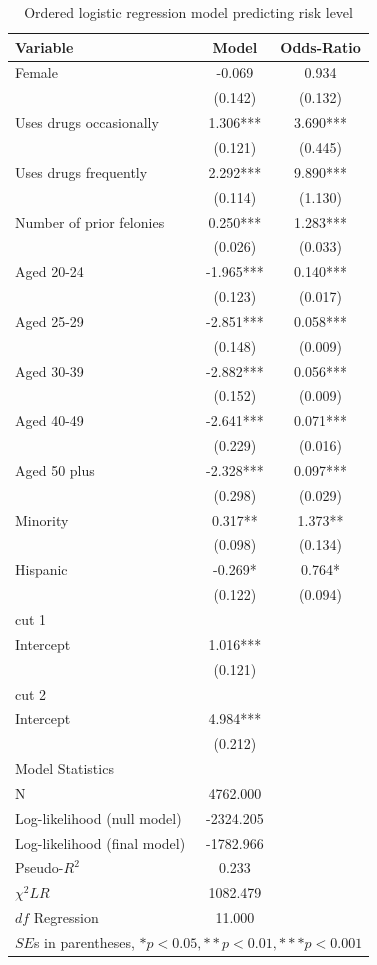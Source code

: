 \begin{table}[htbp]\centering
 \caption{Ordered logistic regression model predicting risk level \label{tab:recdologit}}
\begin{tabular}{lcc}
\hline
Variable      &    Model & Odds-Ratio  \\
\hline
Female   &   -0.069  &    0.934  \\
      &   (0.142)  &   (0.132)  \\
Uses drugs occasionally   &    1.306***&    3.690***\\
      &   (0.121)  &   (0.445)  \\
Uses drugs frequently   &    2.292***&    9.890***\\
      &   (0.114)  &   (1.130)  \\
Number of prior felonies    &    0.250***&    1.283***\\
      &   (0.026)  &   (0.033)  \\
Aged 20-24   &   -1.965***&    0.140***\\
      &   (0.123)  &   (0.017)  \\
Aged 25-29   &   -2.851***&    0.058***\\
      &   (0.148)  &   (0.009)  \\
Aged 30-39   &   -2.882***&    0.056***\\
      &   (0.152)  &   (0.009)  \\
Aged 40-49   &   -2.641***&    0.071***\\
      &   (0.229)  &   (0.016)  \\
Aged 50 plus   &   -2.328***&    0.097***\\
      &   (0.298)  &   (0.029)  \\
Minority    &    0.317** &    1.373** \\
      &   (0.098)  &   (0.134)  \\
Hispanic     &   -0.269* &    0.764* \\
      &   (0.122)  &   (0.094)  \\ \hline
cut 1    &        &        \\
Intercept    &    1.016***&    \\
      &   (0.121)  &   \\
cut 2    &        &        \\
Intercept    &    4.984***&   \\
      &   (0.212)  &   \\
\hline
\multicolumn{1}{l}{Model Statistics} \\
\hline
N      &   4762.000  \\
Log-likelihood (null model)    &  -2324.205  \\
Log-likelihood (final model)     &  -1782.966   \\
Pseudo-$R^2$    &    0.233  \\
$\chi^2 LR$    &   1082.479  \\
$df$ Regression    &    11.000  \\
\hline
\multicolumn{3}{l}{$SE$s in parentheses, $*p<0.05, **p<0.01, ***p<0.001$} \\
\hline
\end{tabular}
\end{table}

